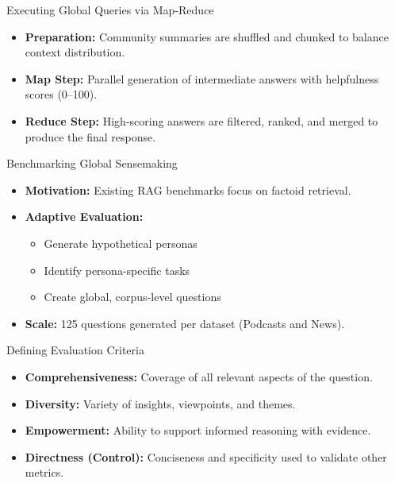 \documentclass[aspectratio=169,xcolor=dvipsnames]{beamer}
\begin{document}
	\begin{frame}{Executing Global Queries via Map-Reduce}
		
		\begin{itemize}
			\item \textbf{Preparation:} Community summaries are shuffled and chunked to balance context distribution.
			
			\item \textbf{Map Step:} Parallel generation of intermediate answers with helpfulness scores (0–100).
			
			\item \textbf{Reduce Step:} High-scoring answers are filtered, ranked, and merged to produce the final response.
		\end{itemize}
		
	\end{frame}
	
	\begin{frame}{Benchmarking Global Sensemaking}
		
		\begin{itemize}
			\item \textbf{Motivation:} Existing RAG benchmarks focus on factoid retrieval.
			
			\item \textbf{Adaptive Evaluation:}
			\begin{itemize}
				\item Generate hypothetical personas
				\item Identify persona-specific tasks
				\item Create global, corpus-level questions
			\end{itemize}
			
			\item \textbf{Scale:} 125 questions generated per dataset (Podcasts and News).
		\end{itemize}
		
	\end{frame}
	
	\begin{frame}{Defining Evaluation Criteria}
		
		\begin{itemize}
			\item \textbf{Comprehensiveness:} Coverage of all relevant aspects of the question.
			
			\item \textbf{Diversity:} Variety of insights, viewpoints, and themes.
			
			\item \textbf{Empowerment:} Ability to support informed reasoning with evidence.
			
			\item \textbf{Directness (Control):} Conciseness and specificity used to validate other metrics.
		\end{itemize}
		
	\end{frame}
	
\end{document}
